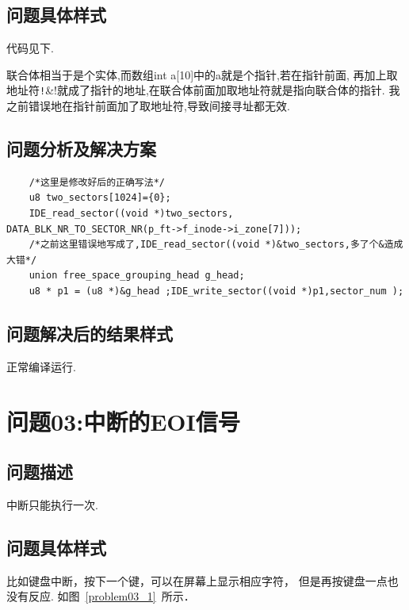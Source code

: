\subsection{问题具体样式}
代码见下.

联合体相当于是个实体,而数组int a[10]中的a就是个指针,若在指针前面,
再加上取地址符\texttt!&!就成了指针的地址,在联合体前面加取地址符就是指向联合体的指针.
我之前错误地在指针前面加了取地址符,导致间接寻址都无效.

\subsection{问题分析及解决方案}
\begin{verbatim}
    /*这里是修改好后的正确写法*/
    u8 two_sectors[1024]={0};
    IDE_read_sector((void *)two_sectors, DATA_BLK_NR_TO_SECTOR_NR(p_ft->f_inode->i_zone[7]));
    /*之前这里错误地写成了,IDE_read_sector((void *)&two_sectors,多了个&造成大错*/
    union free_space_grouping_head g_head;
    u8 * p1 = (u8 *)&g_head ;IDE_write_sector((void *)p1,sector_num );
\end{verbatim}

\subsection{问题解决后的结果样式}
正常编译运行.

\section{问题03:中断的EOI信号}
\subsection{问题描述}
中断只能执行一次.

\subsection{问题具体样式}
比如键盘中断，按下一个键，可以在屏幕上显示相应字符，
但是再按键盘一点也没有反应.
如图~\ref{problem03_1}~所示．	

